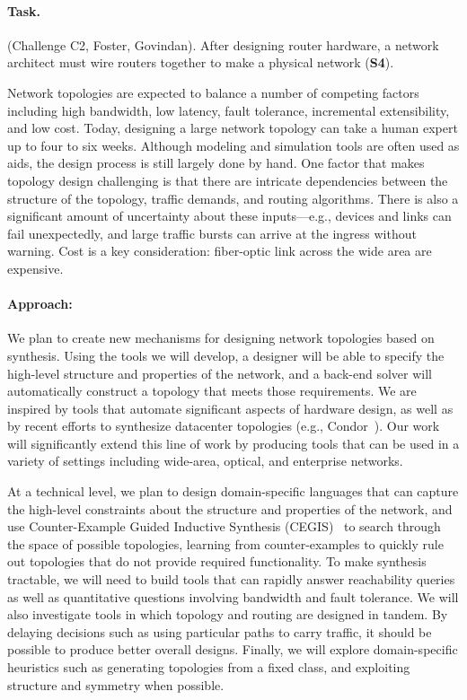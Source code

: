 \paragraph*{Task.} (Challenge C2, Foster, Govindan). After designing
router hardware, a network architect must wire routers together to
make a physical network ({\bf S4}).
%

Network topologies are expected to balance a number of competing
factors including high bandwidth, low latency, fault tolerance,
incremental extensibility, and low cost. Today, designing a large
network topology can take a human expert up to four to six
weeks. Although modeling and simulation tools are often used as aids,
the design process is still largely done by hand. One factor that
makes topology design challenging is that there are intricate
dependencies between the structure of the topology, traffic demands,
and routing algorithms. There is also a significant amount of
uncertainty about these inputs---e.g., devices and links can fail
unexpectedly, and large traffic bursts can arrive at the ingress
without warning. Cost is a key consideration: fiber-optic link across
the wide area are expensive. 

\paragraph*{Approach:}
%
We plan to create new mechanisms for designing network topologies
based on synthesis. Using the tools we will develop, a designer will
be able to specify the high-level structure and properties of the
network, and a back-end solver will automatically construct a topology
that meets those requirements. We are inspired by tools that automate
significant aspects of hardware design, as well as by recent efforts
to synthesize datacenter topologies (e.g., Condor~\cite{Condor}). Our
work will significantly extend this line of work by producing tools
that can be used in a variety of settings including wide-area,
optical, and enterprise networks.

At a technical level, we plan to design domain-specific languages that
can capture the high-level constraints about the structure and
properties of the network, and use Counter-Example Guided Inductive
Synthesis (CEGIS)~\cite{sketch} to search through the space of possible topologies,
learning from counter-examples to quickly rule out topologies that do
not provide required functionality. To make synthesis tractable, we
will need to build tools that can rapidly answer reachability queries
as well as quantitative questions involving bandwidth and fault
tolerance. We will also investigate tools in which topology and
routing are designed in tandem. By delaying decisions such as using
particular paths to carry traffic, it should be possible to produce
better overall designs. Finally, we will explore domain-specific
heuristics such as generating topologies from a fixed class, and
exploiting structure and symmetry when possible.


